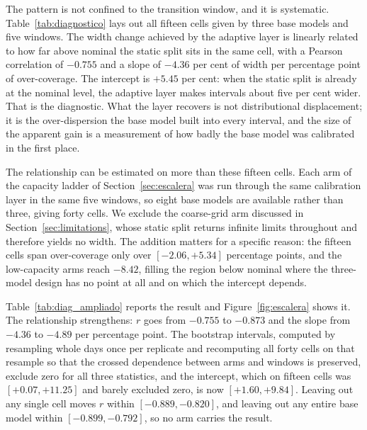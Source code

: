 \documentclass[preprint,3p,times]{elsarticle}
\begin{document}
The pattern is not confined to the transition window, and it is systematic. Table~\ref{tab:diagnostico} lays out all fifteen cells given by three base models and five windows. The width change achieved by the adaptive layer is linearly related to how far above nominal the static split sits in the same cell, with a Pearson correlation of $-0.755$ and a slope of $-4.36$ per cent of width per percentage point of over-coverage. The intercept is $+5.45$ per cent: when the static split is already at the nominal level, the adaptive layer makes intervals about five per cent wider. That is the diagnostic. What the layer recovers is not distributional displacement; it is the over-dispersion the base model built into every interval, and the size of the apparent gain is a measurement of how badly the base model was calibrated in the first place.



The relationship can be estimated on more than these fifteen cells. Each arm of the capacity ladder of Section~\ref{sec:escalera} was run through the same calibration layer in the same five windows, so eight base models are available rather than three, giving forty cells. We exclude the coarse-grid arm discussed in Section~\ref{sec:limitations}, whose static split returns infinite limits throughout and therefore yields no width. The addition matters for a specific reason: the fifteen cells span over-coverage only over $[-2.06, +5.34]$ percentage points, and the low-capacity arms reach $-8.42$, filling the region below nominal where the three-model design has no point at all and on which the intercept depends.



Table~\ref{tab:diag_ampliado} reports the result and Figure~\ref{fig:escalera} shows it. The relationship strengthens: $r$ goes from $-0.755$ to $-0.873$ and the slope from $-4.36$ to $-4.89$ per percentage point. The bootstrap intervals, computed by resampling whole days once per replicate and recomputing all forty cells on that resample so that the crossed dependence between arms and windows is preserved, exclude zero for all three statistics, and the intercept, which on fifteen cells was $[+0.07, +11.25]$ and barely excluded zero, is now $[+1.60, +9.84]$. Leaving out any single cell moves $r$ within $[-0.889, -0.820]$, and leaving out any entire base model within $[-0.899, -0.792]$, so no arm carries the result.
\end{document}
